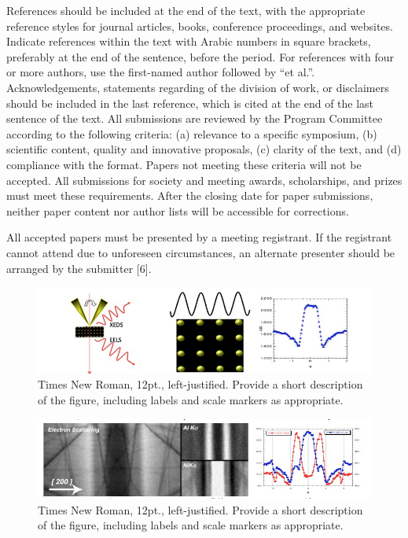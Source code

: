 \documentclass[12pt]{article}
\begin{document}
References should be included at the end of the text, with the appropriate reference styles for journal articles\cite{article1, article2}, books\cite{book}, conference proceedings\cite{proc1}, and websites\cite{webpage}. Indicate references within the text with Arabic numbers in square brackets, preferably at the end of the sentence, before the period. For references with four or more authors, use the first-named author followed by “et al.”. Acknowledgements, statements regarding of the division of work, or disclaimers should be included in the last reference, which is cited at the end of the last sentence of the text.
All submissions are reviewed by the Program Committee according to the following criteria: (a) relevance to a specific symposium, (b) scientific content, quality and innovative proposals, (c) clarity of the text, and (d) compliance with the format.  Papers not meeting these criteria will not be accepted. All submissions for society and meeting awards, scholarships, and prizes must meet these requirements. After the closing date for paper submissions, neither paper content nor author lists will be accessible for corrections.

All accepted papers must be presented by a meeting registrant. If the registrant cannot attend due to unforeseen circumstances, an alternate presenter should be arranged by the submitter [6]. 

\begin{figure}[h]
	\centering
	\includegraphics[width=6.5in]{figure1}
	\caption{Times New Roman, 12pt., left-justified. Provide a short description of the figure, including labels and scale markers as appropriate.}
	\label{fig:figure1}
\end{figure}

\begin{figure}[h]
	\centering
	\includegraphics[width=5in]{figure2}
	\caption{Times New Roman, 12pt., left-justified. Provide a short description of the figure, including labels and scale markers as appropriate.}
	\label{fig:figure2}
\end{figure}

\vspace{-1.5em}
\renewcommand{\refname}{\normalsize{References}}
\printbibliography
\end{document}
